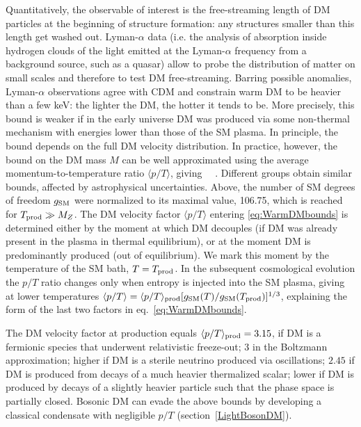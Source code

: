 Quantitatively, the observable of interest is the free-streaming length of DM particles at the beginning of structure formation: any structures smaller than this length get  washed out.
Lyman-$\alpha$ data (i.e. the analysis of absorption inside hydrogen clouds of the light emitted at the Lyman-$\alpha$ frequency from a background source, such as a quasar) allow to probe the distribution of matter on small scales and therefore to test DM free-streaming.
Barring possible anomalies, Lyman-$\alpha$ observations agree with CDM and
constrain warm DM to be heavier than a few keV: the lighter the DM, the hotter it tends to be.
More precisely, this bound is weaker if in the early universe DM was produced via some non-thermal mechanism with energies lower than those of the SM plasma.
In principle, the bound depends on the full DM velocity distribution.
In practice, however, the bound on the DM mass $M$ can be well approximated using the average momentum-to-temperature ratio $\langle p/T\rangle$, giving~\cite{WarmDMbounds}
\beq 
{}~.
\label{eq:WarmDMbounds}
\eeq
Different groups obtain similar bounds, affected by astrophysical uncertainties.
Above, the number of SM degrees of freedom $g_{\rm SM}$ were normalized to its
maximal value, 106.75, which is reached for $T_{\rm prod} \gg M_Z$. The DM velocity factor $\langle p/T\rangle $ entering \eqref{eq:WarmDMbounds} is determined either by the moment at which DM decouples (if DM was already present in the plasma in thermal equilibrium), or at the moment DM is predominantly produced (out of equilibrium). We mark this moment by the temperature of the SM bath, $T= T_{\rm prod}$.
In the subsequent cosmological evolution the $p/T$ ratio changes only when entropy is injected into the SM plasma,
giving at lower temperatures $\langle p/T\rangle = \langle p/T\rangle_{\rm prod} [g_{\rm SM}(T)/g_{\rm SM}(T_{\rm prod})]^{1/3}$, explaining the form of the last two factors in eq.~\eqref{eq:WarmDMbounds}.


The DM velocity factor at production 
equals ${\langle p/T\rangle_{\rm prod}} = 3.15$, if DM is a fermionic species that underwent 
relativistic freeze-out;
3 in the Boltzmann approximation;
higher if DM is a sterile neutrino produced via oscillations;
$2.45$ if DM is produced from decays of a much heavier thermalized scalar;
lower if DM is produced by decays of a slightly heavier particle such that the phase space is partially closed. 
Bosonic DM  can evade the above bounds by
developing a classical condensate with negligible $p/T$ (section~\ref{LightBosonDM}).


